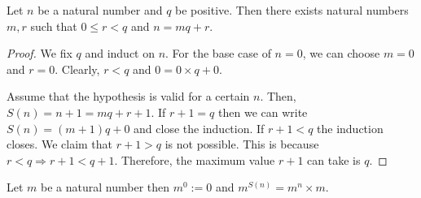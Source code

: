 \begin{prop}\label{c1s5p9}
Let $n$ be a natural number and $q$ be positive. Then there exists natural
numbers $m, r$ such that $0 \le r < q$ and $n = mq + r$.
\end{prop}
\begin{proof}
We fix $q$ and induct on $n$. For the base case of $n = 0$, we can choose
$m = 0$ and $r = 0$. Clearly, $r < q$ and $0 = 0 \times q + 0$.

Assume that the hypothesis is valid for a certain $n$. Then, $S(n) = n + 1
= mq + r + 1$. If $r + 1 = q$ then we can write $S(n) = (m + 1)q + 0$ and
close the induction. If $r + 1 < q$ the induction closes. We claim that
$r + 1 > q$ is not possible. This is because $r < q \Rightarrow r + 1 < q + 
1$. Therefore, the maximum value $r + 1$ can take is $q$.
\end{proof}

\begin{defn}\label{c1s5d2}
Let $m$ be a natural number then $m^0 := 0$ and $m^{S(n)} = m^n \times m$.
\end{defn}
